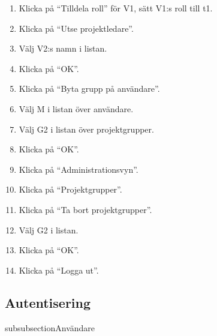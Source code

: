 \documentclass[a4paper]{article}
\begin{document}
\begin{ST}
\begin{enumerate}
\item Klicka på ``Tilldela roll'' för V1, sätt V1:s roll till t1.
\item Klicka på ``Utse projektledare''.
\item Välj V2:s namn i listan.
\item Klicka på ``OK''.
\item Klicka på ``Byta grupp på användare''.
\item Välj M i listan över användare.
\item Välj G2 i listan över projektgrupper.
\item Klicka på ``OK''.
\item Klicka på ``Administrationsvyn''.
\item Klicka på ``Projektgrupper''.
\item Klicka på ``Ta bort projektgrupper''.
\item Välj G2 i listan.
\item Klicka på ``OK''.
\item Klicka på ``Logga ut''. 
\end{enumerate}
\end{ST}




\subsection{Autentisering}

subsubsection{Användare}
\end{document}
